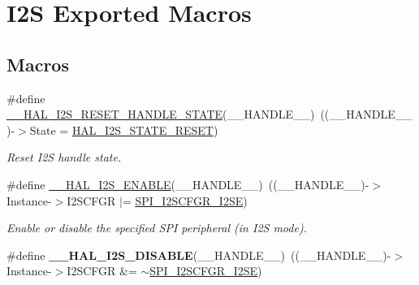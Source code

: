 \hypertarget{group___i2_s___exported___macros}{}\section{I2S Exported Macros}
\label{group___i2_s___exported___macros}
\subsection*{Macros}
\begin{DoxyCompactItemize}
\item 
\#define \hyperlink{group___i2_s___exported___macros_ga6c4a9d76f38d834137575776a5b7f60f}{\+\_\+\+\_\+\+H\+A\+L\+\_\+\+I2\+S\+\_\+\+R\+E\+S\+E\+T\+\_\+\+H\+A\+N\+D\+L\+E\+\_\+\+S\+T\+A\+TE}(\+\_\+\+\_\+\+H\+A\+N\+D\+L\+E\+\_\+\+\_\+)~((\+\_\+\+\_\+\+H\+A\+N\+D\+L\+E\+\_\+\+\_\+)-\/$>$State = \hyperlink{group___i2_s___exported___types_gga2588a0c71baf7cd6d2c1b9b11120bef0a2b69279eb021ef38d711edcdc5c95054}{H\+A\+L\+\_\+\+I2\+S\+\_\+\+S\+T\+A\+T\+E\+\_\+\+R\+E\+S\+ET})
\begin{DoxyCompactList}\small\item\em Reset I2S handle state. \end{DoxyCompactList}\item 
\#define \hyperlink{group___i2_s___exported___macros_ga4b5ca1e0e5bf616c99d38b8f0c5bdded}{\+\_\+\+\_\+\+H\+A\+L\+\_\+\+I2\+S\+\_\+\+E\+N\+A\+B\+LE}(\+\_\+\+\_\+\+H\+A\+N\+D\+L\+E\+\_\+\+\_\+)~((\+\_\+\+\_\+\+H\+A\+N\+D\+L\+E\+\_\+\+\_\+)-\/$>$Instance-\/$>$I2\+S\+C\+F\+GR $\vert$= \hyperlink{group___peripheral___registers___bits___definition_ga30d76c7552c91bbd5cbac70d9c56ebb3}{S\+P\+I\+\_\+\+I2\+S\+C\+F\+G\+R\+\_\+\+I2\+SE})
\begin{DoxyCompactList}\small\item\em Enable or disable the specified S\+PI peripheral (in I2S mode). \end{DoxyCompactList}\item 
\#define {\bfseries \+\_\+\+\_\+\+H\+A\+L\+\_\+\+I2\+S\+\_\+\+D\+I\+S\+A\+B\+LE}(\+\_\+\+\_\+\+H\+A\+N\+D\+L\+E\+\_\+\+\_\+)~((\+\_\+\+\_\+\+H\+A\+N\+D\+L\+E\+\_\+\+\_\+)-\/$>$Instance-\/$>$I2\+S\+C\+F\+GR \&= $\sim$\hyperlink{group___peripheral___registers___bits___definition_ga30d76c7552c91bbd5cbac70d9c56ebb3}{S\+P\+I\+\_\+\+I2\+S\+C\+F\+G\+R\+\_\+\+I2\+SE})\hypertarget{group___i2_s___exported___macros_gac4f398db7f68fb8354bff61a9a6372b9}{}\label{group___i2_s___exported___macros_gac4f398db7f68fb8354bff61a9a6372b9}


\end{DoxyCompactItemize}
